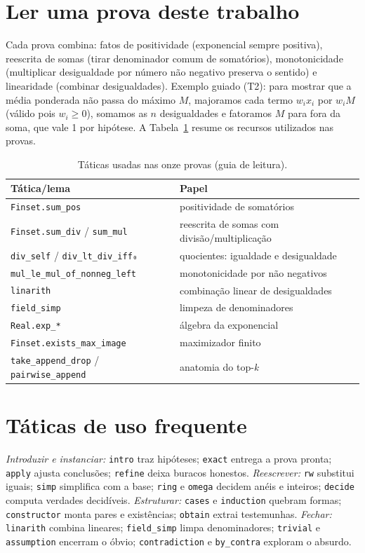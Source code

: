 \section{Ler uma prova deste trabalho}
Cada prova combina: fatos de positividade (exponencial sempre positiva), reescrita de somas (tirar denominador comum de somatórios), monotonicidade (multiplicar desigualdade por número não negativo preserva o sentido) e linearidade (combinar desigualdades). Exemplo guiado (T2): para mostrar que a média ponderada não passa do máximo $M$, majoramos cada termo $w_ix_i$ por $w_iM$ (válido pois $w_i\geq0$), somamos as $n$ desigualdades e fatoramos $M$ para fora da soma, que vale 1 por hipótese.
A Tabela~\ref{tab:taticas} resume os recursos utilizados nas provas.
\begin{table}[htbp]
\fontsize{10}{12}\selectfont\SingleSpacing
\centering
\caption{Táticas usadas nas onze provas (guia de leitura).}
\label{tab:taticas}\begin{tabularx}{\textwidth}{XX}
\toprule
Tática/lema & Papel \\
\midrule
\texttt{Finset.sum\_pos} & positividade de somatórios \\
\texttt{Finset.sum\_div} / \texttt{sum\_mul} & reescrita de somas com divisão/multiplicação \\
\texttt{div\_self} / \texttt{div\_lt\_div\_iff₀} & quocientes: igualdade e desigualdade \\
\nolinkurl{mul_le_mul_of_nonneg_left} & monotonicidade por não negativos \\
\texttt{linarith} & combinação linear de desigualdades \\
\texttt{field\_simp} & limpeza de denominadores \\
\texttt{Real.exp\_*} & álgebra da exponencial \\
\nolinkurl{Finset.exists_max_image} & maximizador finito \\
\texttt{take\_append\_drop} / \texttt{pairwise\_append} & anatomia do top-\textit{k} \\
\bottomrule
\end{tabularx}
\end{table}
\section{Táticas de uso frequente}
\textit{Introduzir e instanciar:} \texttt{intro} traz hipóteses; \texttt{exact} entrega a prova pronta; \texttt{apply} ajusta conclusões; \texttt{refine} deixa buracos honestos. \textit{Reescrever:} \texttt{rw} substitui iguais; \texttt{simp} simplifica com a base; \texttt{ring} e \texttt{omega} decidem anéis e inteiros; \texttt{decide} computa verdades decidíveis. \textit{Estruturar:} \texttt{cases} e \texttt{induction} quebram formas; \texttt{constructor} monta pares e existências; \texttt{obtain} extrai testemunhas. \textit{Fechar:} \texttt{linarith} combina lineares; \texttt{field\_simp} limpa denominadores; \texttt{trivial} e \texttt{assumption} encerram o óbvio; \texttt{contradiction} e \texttt{by\_contra} exploram o absurdo.
